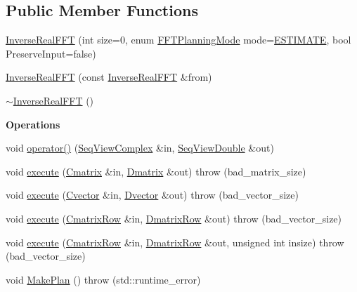 \subsection*{Public Member Functions}
\begin{DoxyCompactItemize}
\item 
\hyperlink{classtsa_1_1_inverse_real_f_f_t_a50258b4d4596d93935791135cd22feb9}{Inverse\+Real\+F\+FT} (int size=0, enum \hyperlink{namespacetsa_a217e07ef78939f88b22c8428ac96b1ae}{F\+F\+T\+Planning\+Mode} mode=\hyperlink{namespacetsa_a217e07ef78939f88b22c8428ac96b1aea2762be66fb6f3e4772c7f4cc162b9750}{E\+S\+T\+I\+M\+A\+TE}, bool Preserve\+Input=false)
\item 
\hyperlink{classtsa_1_1_inverse_real_f_f_t_a5a9e17eaf4fd69e719dca4b881010876}{Inverse\+Real\+F\+FT} (const \hyperlink{classtsa_1_1_inverse_real_f_f_t}{Inverse\+Real\+F\+FT} \&from)
\item 
\hyperlink{classtsa_1_1_inverse_real_f_f_t_a928e08fb19e46a901e0dc42ec5970801}{$\sim$\+Inverse\+Real\+F\+FT} ()
\end{DoxyCompactItemize}
\begin{Indent}\textbf{ Operations}\par
\begin{DoxyCompactItemize}
\item 
void \hyperlink{classtsa_1_1_inverse_real_f_f_t_a619333f55b1526e03169c9c8be29d442}{operator()} (\hyperlink{namespacetsa_ab32775c889b53c40fa83939f22372b75}{Seq\+View\+Complex} \&in, \hyperlink{namespacetsa_ac599574bcc094eda25613724b8f3ca9e}{Seq\+View\+Double} \&out)
\item 
void \hyperlink{classtsa_1_1_inverse_real_f_f_t_ac37c11d801f396360818a54dddf1c9d1}{execute} (\hyperlink{namespacetsa_a86348fef1603a135fe5fba9e5f5486ee}{Cmatrix} \&in, \hyperlink{namespacetsa_ad260cd21c1891c4ed391fe788569aba4}{Dmatrix} \&out)  throw (bad\+\_\+matrix\+\_\+size)
\item 
void \hyperlink{classtsa_1_1_inverse_real_f_f_t_a2693642ff2282921710456dea0915b40}{execute} (\hyperlink{namespacetsa_a054d1045ead95a65819e9e5722baf600}{Cvector} \&in, \hyperlink{namespacetsa_a8900fb03d849baf447a1a0efe2561fb2}{Dvector} \&out)  throw (bad\+\_\+vector\+\_\+size)
\item 
void \hyperlink{classtsa_1_1_inverse_real_f_f_t_aaa4b1dd80a308eb09a9dc9fe1aeba51e}{execute} (\hyperlink{namespacetsa_ad294f56c16152a1618cbe2f19b768e2e}{Cmatrix\+Row} \&in, \hyperlink{namespacetsa_aeaf3be962a114beef3d9e89b0fb49bf4}{Dmatrix\+Row} \&out)  throw (bad\+\_\+vector\+\_\+size)
\item 
void \hyperlink{classtsa_1_1_inverse_real_f_f_t_a6264c0d0b0b4a31e584a390b06281631}{execute} (\hyperlink{namespacetsa_ad294f56c16152a1618cbe2f19b768e2e}{Cmatrix\+Row} \&in, \hyperlink{namespacetsa_aeaf3be962a114beef3d9e89b0fb49bf4}{Dmatrix\+Row} \&out, unsigned int insize)  throw (bad\+\_\+vector\+\_\+size)
\item 
void \hyperlink{classtsa_1_1_inverse_real_f_f_t_ae5b45701f989efce89c6c336ec78c189}{Make\+Plan} ()  throw (std\+::runtime\+\_\+error)
\end{DoxyCompactItemize}
\end{Indent}
